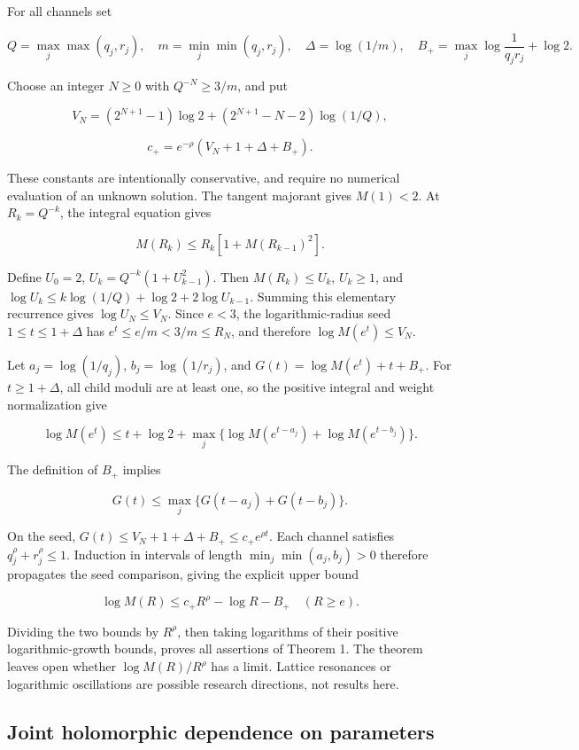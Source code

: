 For all channels set

\[
Q=\max_j\max(q_j,r_j),\quad
m=\min_j\min(q_j,r_j),\quad
\Delta=\log(1/m),\quad
B_+=\max_j\log\frac1{q_jr_j}+\log2.
\]

Choose an integer \(N\ge0\) with \(Q^{-N}\ge3/m\), and put

\[
V_N=(2^{N+1}-1)\log2+
       (2^{N+1}-N-2)\log(1/Q),
\]

\[
c_+=e^{-\rho}(V_N+1+\Delta+B_+).
\]

These constants are intentionally conservative, and require no numerical
evaluation of an unknown solution. The tangent majorant gives
\(M(1)<2\). At \(R_k=Q^{-k}\), the integral equation gives

\[
M(R_k)\le R_k[1+M(R_{k-1})^2].
\]

Define \(U_0=2\), \(U_k=Q^{-k}(1+U_{k-1}^2)\). Then \(M(R_k)\le U_k\),
\(U_k\ge1\), and \(\log U_k\le k\log(1/Q)+\log2+2\log U_{k-1}\). Summing
this elementary recurrence gives \(\log U_N\le V_N\). Since \(e<3\), the
logarithmic-radius seed \(1\le t\le1+\Delta\) has
\(e^t\le e/m<3/m\le R_N\), and therefore \(\log M(e^t)\le V_N\).

Let \(a_j=\log(1/q_j)\), \(b_j=\log(1/r_j)\), and
\(G(t)=\log M(e^t)+t+B_+\). For \(t\ge1+\Delta\), all child moduli are
at least one, so the positive integral and weight normalization give

\[
\log M(e^t)\le t+\log2+
\max_j\{\log M(e^{t-a_j})+\log M(e^{t-b_j})\}.
\]

The definition of \(B_+\) implies

\[
G(t)\le\max_j\{G(t-a_j)+G(t-b_j)\}.
\]

On the seed, \(G(t)\le V_N+1+\Delta+B_+\le c_+e^{\rho t}\). Each channel
satisfies \(q_j^\rho+r_j^\rho\le1\). Induction in intervals of length
\(\min_j\min(a_j,b_j)>0\) therefore propagates the seed comparison,
giving the explicit upper bound

\[
\boxed{\log M(R)\le c_+R^\rho-\log R-B_+\quad(R\ge e).}
\]

Dividing the two bounds by \(R^\rho\), then taking logarithms of their
positive logarithmic-growth bounds, proves all assertions of Theorem 1.
The theorem leaves open whether \(\log M(R)/R^\rho\) has a limit.
Lattice resonances or logarithmic oscillations are possible research
directions, not results here.

\hypertarget{joint-holomorphic-dependence-on-parameters}{%
\subsection{Joint holomorphic dependence on
parameters}\label{joint-holomorphic-dependence-on-parameters}}

